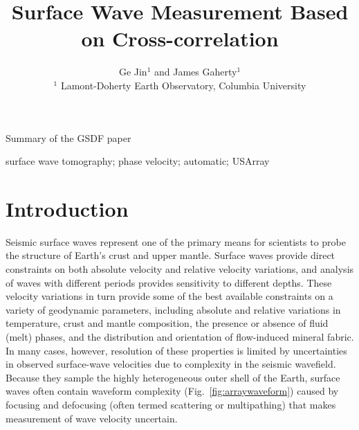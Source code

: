 \documentclass[referee]{gji}
\title[Surface Wave Measurement Based on Cross-correlation]
	{Surface Wave Measurement Based on Cross-correlation}
\author[Ge Jin and James Gaherty]
  {Ge Jin$^1$ and James Gaherty$^1$ \\
  $^1$ Lamont-Doherty Earth Observatory, Columbia University
  }
\date{}
\begin{document}
\label{firstpage}

\maketitle


\begin{summary}
	Summary of the GSDF paper
\end{summary}

\begin{keywords}
	 surface wave tomography; phase velocity; automatic; USArray
\end{keywords}

\section{Introduction}

Seismic surface waves represent one of the primary means for scientists to probe the structure of Earth's crust and upper mantle.  Surface waves provide direct constraints on both absolute velocity and relative velocity variations, and analysis of waves with different periods provides sensitivity to different depths.  These velocity variations in turn provide some of the best available constraints on a variety of geodynamic parameters, including absolute and relative variations in temperature, crust and mantle composition, the presence or absence of fluid (melt) phases, and the distribution and orientation of flow-induced mineral fabric.  In many cases, however, resolution of these properties is limited by uncertainties in observed surface-wave velocities due to complexity in the seismic wavefield.  Because they sample the highly heterogeneous outer shell of the Earth, surface waves often contain waveform complexity (Fig.~\ref{fig:arraywaveform}) caused by focusing and defocusing (often termed scattering or multipathing) that makes measurement of wave velocity uncertain. 
\end{document}
